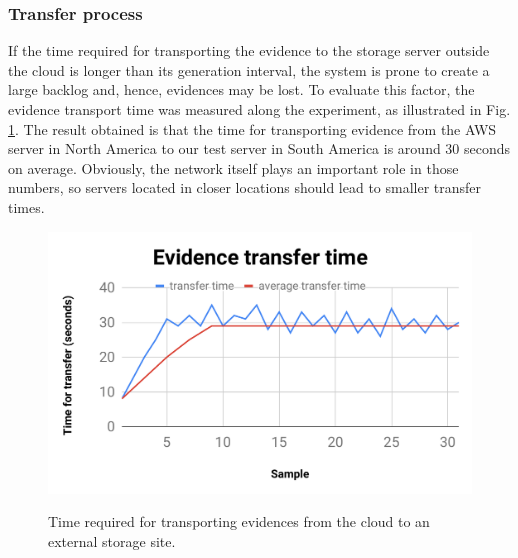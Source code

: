 \documentclass[conference]{IEEEtran}
\newcommand{\marcos}[1]{{\color{green}{MARCOS: #1}}}
\begin{document}
\subsubsection{Transfer process}
If the time required for transporting the evidence to the storage server outside the cloud is longer than its generation interval, the system is prone to create a large backlog and, hence, evidences may be lost.
%
%
To evaluate this factor, the evidence transport time was measured along the experiment, as illustrated in Fig. \ref{fig:evidencia_transporte}.
%
The result obtained is that the time for transporting evidence from the AWS server in North America to our test server in South America is around 30 seconds on average.
%
Obviously, the network itself plays an important role in those numbers, so servers located in closer locations should lead to smaller transfer times.
%
%
%
%
%

\begin{figure}[htb!]
\footnotesize
\caption{Time required for transporting evidences from the cloud to an external storage site.
}
\includegraphics[center,scale=0.45]{evidencia_download_ieee.pdf}
\centering
\label{fig:evidencia_transporte}
\end{figure}
\end{document}
